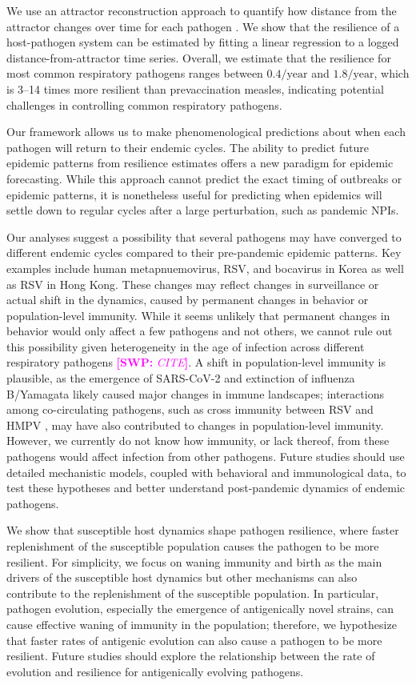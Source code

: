 \documentclass[12pt]{article}
\newcommand{\comment}{\showcomment}
\newcommand{\showcomment}[3]{\textcolor{#1}{\textbf{[#2: }\textsl{#3}\textbf{]}}}
\newcommand{\swp}[1]{\comment{magenta}{SWP}{#1}}
\begin{document}
We use an attractor reconstruction approach to quantify how distance from the attractor changes over time for each pathogen \citep{takens2006detecting}.
We show that the resilience of a host-pathogen system can be estimated by fitting a linear regression to a logged distance-from-attractor time series.
Overall, we estimate that the resilience for most common respiratory pathogens ranges between $0.4/\mathrm{year}$ and $1.8/\mathrm{year}$, which is 3--14 times more resilient than prevaccination measles, indicating potential challenges in controlling common respiratory pathogens.

Our framework allows us to make phenomenological predictions about when each pathogen will return to their endemic cycles.
The ability to predict future epidemic patterns from resilience estimates offers a new paradigm for epidemic forecasting.
While this approach cannot predict the exact timing of outbreaks or epidemic patterns, it is nonetheless useful for predicting when epidemics will settle down to regular cycles after a large perturbation, such as pandemic NPIs.

Our analyses suggest a possibility that several pathogens may have converged to different endemic cycles compared to their pre-pandemic epidemic patterns.
Key examples include human metapnuemovirus, RSV, and bocavirus in Korea as well as RSV in Hong Kong.
These changes may reflect changes in surveillance or actual shift in the dynamics, caused by permanent changes in behavior or population-level immunity.
While it seems unlikely that permanent changes in behavior would only affect a few pathogens and not others, we cannot rule out this possibility given heterogeneity in the age of infection across different respiratory pathogens \swp{CITE}.
A shift in population-level immunity is plausible, as the emergence of SARS-CoV-2 and extinction of influenza B/Yamagata likely caused major changes in immune landscapes;
interactions among co-circulating pathogens, such as cross immunity between RSV and HMPV \citep{bhattacharyya2015cross}, may have also contributed to changes in population-level immunity.
However, we currently do not know how immunity, or lack thereof, from these pathogens would affect infection from other pathogens.
Future studies should use detailed mechanistic models, coupled with behavioral and immunological data, to test these hypotheses and better understand post-pandemic dynamics of endemic pathogens.

We show that susceptible host dynamics shape pathogen resilience, where faster replenishment of the susceptible population causes the pathogen to be more resilient.
For simplicity, we focus on waning immunity and birth as the main drivers of the susceptible host dynamics but other mechanisms can also contribute to the replenishment of the susceptible population.
In particular, pathogen evolution, especially the emergence of antigenically novel strains, can cause effective waning of immunity in the population;
therefore, we hypothesize that faster rates of antigenic evolution can also cause a pathogen to be more resilient.
Future studies should explore the relationship between the rate of evolution and resilience for antigenically evolving pathogens.
\end{document}
